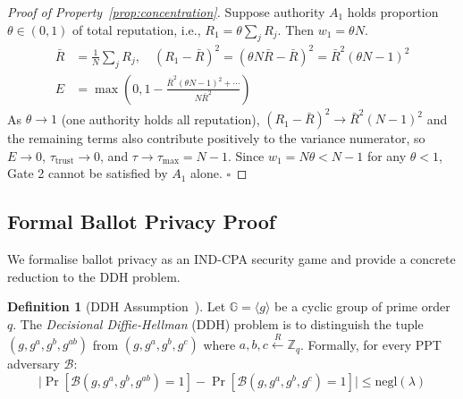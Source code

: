 \documentclass[12pt,a4paper]{article}
\theoremstyle{definition}
\newtheorem{definition}{Definition}[section]
\theoremstyle{remark}
\begin{document}
\begin{proof}[Proof of Property~\ref{prop:concentration}]
  Suppose authority $A_1$ holds proportion $\theta \in (0,1)$ of total
  reputation, i.e., $R_1 = \theta \sum_j R_j$.
  Then $w_1 = \theta N$.
  \begin{align*}
    \bar{R} &= \tfrac{1}{N}\sum_j R_j, \quad
    (R_1 - \bar{R})^2 = \left(\theta N \bar{R} - \bar{R}\right)^2
                      = \bar{R}^2(\theta N - 1)^2 \\
    E &= \max\!\left(0, 1 - \frac{\bar{R}^2(\theta N-1)^2 + \cdots}
                                  {N\bar{R}^2}\right)
  \end{align*}
  As $\theta \to 1$ (one authority holds all reputation),
  $(R_1-\bar{R})^2 \to \bar{R}^2(N-1)^2$ and the remaining terms also
  contribute positively to the variance numerator, so $E \to 0$,
  $\tau_{\text{trust}} \to 0$, and $\tau \to \tau_{\text{max}} = N-1$.
  Since $w_1 = N\theta < N-1$ for any $\theta < 1$, Gate 2 cannot be
  satisfied by $A_1$ alone. \hfill$\square$
\end{proof}

\subsection{Formal Ballot Privacy Proof}

We formalise ballot privacy as an IND-CPA security game and provide a
concrete reduction to the DDH problem.

\begin{definition}[DDH Assumption~\cite{boneh1998}]
  Let $\mathbb{G} = \langle g \rangle$ be a cyclic group of prime order $q$.
  The \emph{Decisional Diffie-Hellman} (DDH) problem is to distinguish the
  tuple $(g, g^a, g^b, g^{ab})$ from $(g, g^a, g^b, g^c)$ where
  $a, b, c \xleftarrow{R} \mathbb{Z}_q$.
  Formally, for every PPT adversary $\mathcal{B}$:
  \begin{equation}
    \bigl|\Pr[\mathcal{B}(g, g^a, g^b, g^{ab}) = 1]
         - \Pr[\mathcal{B}(g, g^a, g^b, g^c) = 1]\bigr|
    \leq \mathrm{negl}(\lambda)
  \end{equation}
\end{definition}
\end{document}
